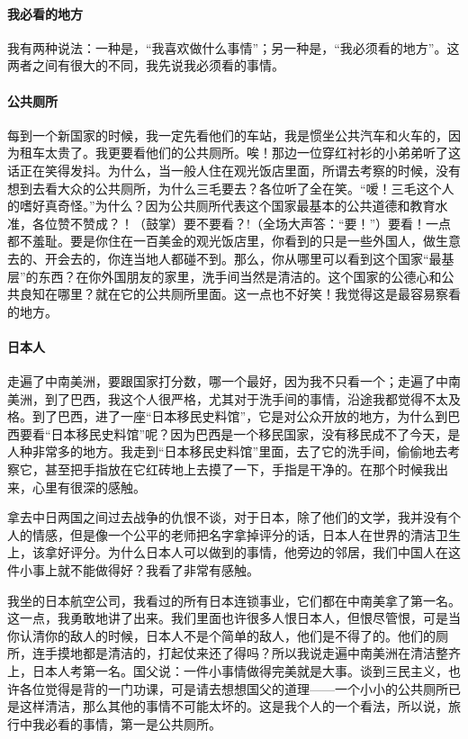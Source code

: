 \paragraph*{我必看的地方}
\par 我有两种说法：一种是，“我喜欢做什么事情”；另一种是，“我必须看的地方”。这两者之间有很大的不同，我先说我必须看的事情。
\paragraph*{公共厕所}
\par 每到一个新国家的时候，我一定先看他们的车站，我是惯坐公共汽车和火车的，因为租车太贵了。我更要看他们的公共厕所。唉！那边一位穿红衬衫的小弟弟听了这话正在笑得发抖。为什么，当一般人住在观光饭店里面，所谓去考察的时候，没有想到去看大众的公共厕所，为什么三毛要去？各位听了全在笑。“嗳！三毛这个人的嗜好真奇怪。”为什么？因为公共厕所代表这个国家最基本的公共道德和教育水准，各位赞不赞成？！（鼓掌）要不要看？!（全场大声答：“要！”）要看！一点都不羞耻。要是你住在一百美金的观光饭店里，你看到的只是一些外国人，做生意去的、开会去的，你连当地人都碰不到。那么，你从哪里可以看到这个国家“最基层”的东西？在你外国朋友的家里，洗手间当然是清洁的。这个国家的公德心和公共良知在哪里？就在它的公共厕所里面。这一点也不好笑！我觉得这是最容易察看的地方。
\paragraph*{日本人}
\par 走遍了中南美洲，要跟国家打分数，哪一个最好，因为我不只看一个；走遍了中南美洲，到了巴西，我这个人很严格，尤其对于洗手间的事情，沿途我都觉得不太及格。到了巴西，进了一座“日本移民史料馆”，它是对公众开放的地方，为什么到巴西要看“日本移民史料馆”呢？因为巴西是一个移民国家，没有移民成不了今天，是人种非常多的地方。我走到“日本移民史料馆”里面，去了它的洗手间，偷偷地去考察它，甚至把手指放在它红砖地上去摸了一下，手指是干净的。在那个时候我出来，心里有很深的感触。
\par 拿去中日两国之间过去战争的仇恨不谈，对于日本，除了他们的文学，我并没有个人的情感，但是像一个公平的老师把名字拿掉评分的话，日本人在世界的清洁卫生上，该拿好评分。为什么日本人可以做到的事情，他旁边的邻居，我们中国人在这件小事上就不能做得好？我看了非常有感触。
\par 我坐的日本航空公司，我看过的所有日本连锁事业，它们都在中南美拿了第一名。这一点，我勇敢地讲了出来。我们里面也许很多人恨日本人，但恨尽管恨，可是当你认清你的敌人的时候，日本人不是个简单的敌人，他们是不得了的。他们的厕所，连手摸地都是清洁的，打起仗来还了得吗？所以我说走遍中南美洲在清洁整齐上，日本人考第一名。国父说：一件小事情做得完美就是大事。谈到三民主义，也许各位觉得是背的一门功课，可是请去想想国父的道理——一个小小的公共厕所已是这样清洁，那么其他的事情不可能太坏的。这是我个人的一个看法，所以说，旅行中我必看的事情，第一是公共厕所。
